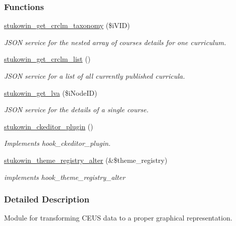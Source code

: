\subsubsection*{Functions}
\begin{DoxyCompactItemize}
\item 
\hyperlink{group___drupal2_a_g_g_gaf137f10bef98707dacaf33d6581773d0}{stukowin\+\_\+get\+\_\+crclm\+\_\+taxonomy} (\$i\+V\+I\+D)
\begin{DoxyCompactList}\small\item\em J\+S\+O\+N service for the nested array of courses details for one curriculum. \end{DoxyCompactList}\item 
\hyperlink{group___drupal2_a_g_g_gad0cb4d7faa68097f5b7df8311e36b22e}{stukowin\+\_\+get\+\_\+crclm\+\_\+list} ()
\begin{DoxyCompactList}\small\item\em J\+S\+O\+N service for a list of all currently published curricula. \end{DoxyCompactList}\item 
\hyperlink{group___drupal2_a_g_g_ga7522e206f1a87971b916a7a0be0098c6}{stukowin\+\_\+get\+\_\+lva} (\$i\+Node\+I\+D)
\begin{DoxyCompactList}\small\item\em J\+S\+O\+N service for the details of a single course. \end{DoxyCompactList}\item 
\hyperlink{group___drupal2_a_g_g_gae3c906d1ab9c3d8ed245d58c1ebf2a4a}{stukowin\+\_\+ckeditor\+\_\+plugin} ()
\begin{DoxyCompactList}\small\item\em Implements hook\+\_\+ckeditor\+\_\+plugin. \end{DoxyCompactList}\item 
\hyperlink{group___drupal2_a_g_g_ga3bf2203298453c41bf9a5ec48d3c2de3}{stukowin\+\_\+theme\+\_\+registry\+\_\+alter} (\&\$theme\+\_\+registry)
\begin{DoxyCompactList}\small\item\em implements hook\+\_\+theme\+\_\+registry\+\_\+alter \end{DoxyCompactList}\end{DoxyCompactItemize}


\subsubsection{Detailed Description}
Module for transforming C\+E\+U\+S data to a proper graphical representation. 

